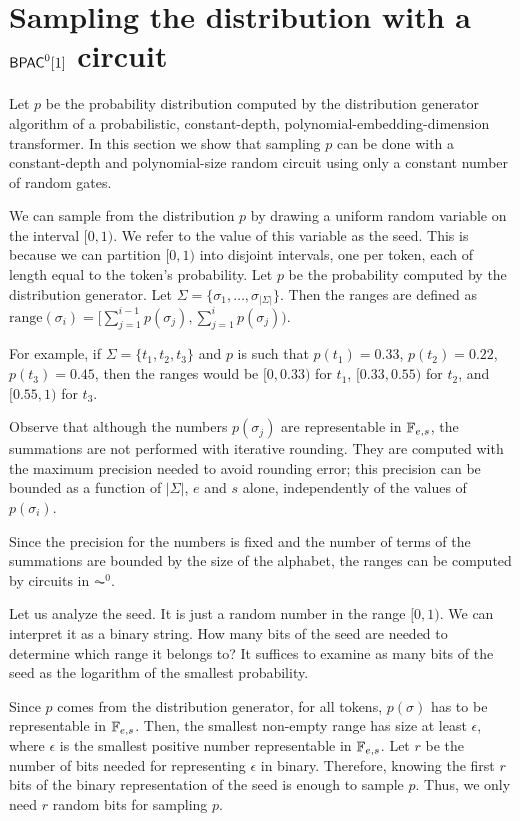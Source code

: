 \section{Sampling the distribution with a \texorpdfstring{$\mathsf{BPAC}^0[1]$}{BPAC0[1]} circuit}\label{appendix:sample-bpac}

Let $p$ be the probability distribution computed by the distribution generator algorithm of a probabilistic, constant-depth, polynomial-embedding-dimension transformer.
In this section we show that sampling $p$ can be done with a constant-depth and polynomial-size random circuit using only a constant number of random gates.

\medskip

We can sample from the distribution $p$ by drawing a uniform random variable on the interval $[0,1)$.
We refer to the value of this variable as the seed.
This is because we can partition $[0,1)$ into disjoint intervals, one per token, each of length equal to the token's probability.
Let $p$ be the probability computed by the distribution generator. 
Let $\Sigma = \{\sigma_1, \dots, \sigma_{|\Sigma|}\}$.
Then the ranges are defined as $\text{range}(\sigma_i) = [\sum_{j=1}^{i-1}p(\sigma_j), \sum_{j=1}^{i}p(\sigma_j))$.

For example, if $\Sigma = \{t_1, t_2, t_3\}$ and $p$ is such that $p(t_1) = 0.33$, $p(t_2) = 0.22$, $p(t_3) = 0.45$, then the ranges would be $[0, 0.33)$ for $t_1$, $[0.33, 0.55)$ for $t_2$, and $[0.55, 1)$ for $t_3$.

Observe that although the numbers $p(\sigma_j)$ are representable in $\mathbb{F}_{e,s}$, the summations are not performed with iterative rounding.
They are computed with the maximum precision needed to avoid rounding error; this precision can be bounded as a function of $|\Sigma|$, $e$ and $s$ alone, independently of the values of $p(\sigma_i)$.

Since the precision for the numbers is fixed and the number of terms of the summations are bounded by the size of the alphabet, the ranges can be computed by circuits in $\AC^0$.

\medskip

Let us analyze the seed.
It is just a random number in the range $[0,1)$.
We can interpret it as a binary string.
How many bits of the seed are needed to determine which range it belongs to?
It suffices to examine as many bits of the seed as the logarithm of the smallest probability.

Since $p$ comes from the distribution generator, for all tokens, $p(\sigma)$ has to be representable in $\mathbb{F}_{e,s}$.
Then, the smallest non-empty range has size at least $\epsilon$, where $\epsilon$ is the smallest positive number representable in $\mathbb{F}_{e,s}$.
Let $r$ be the number of bits needed for representing $\epsilon$ in binary.
Therefore, knowing the first $r$ bits of the binary representation of the seed is enough to sample $p$.
Thus, we only need $r$ random bits for sampling $p$.


